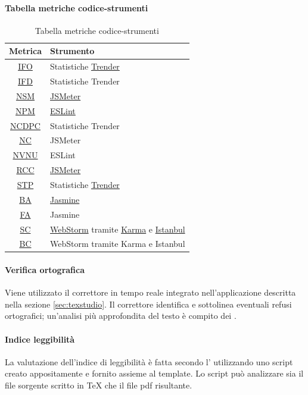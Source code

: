 		\paragraph{Tabella metriche codice-strumenti}
		\begin{table}[H]
			\centering
			\label{tab:metriceCodiceStrumenti}
			\begin{tabular}{cl}
				\toprule
				Metrica & Strumento \\
				\hline
				\hyperref[IFO]{IFO}		& Statistiche \hyperref[sec:trender]{Trender} \\
				\hyperref[IFD]{IFD}		& Statistiche Trender \\
				\hyperref[NSM]{NSM}		& \hyperref[sec:JSMeter]{JSMeter} \\
				\hyperref[NPM]{NPM}		& \hyperref[sec:ESLint]{ESLint} \\
				\hyperref[NCDPC]{NCDPC}	& Statistiche Trender \\
				\hyperref[NC]{NC}		& JSMeter \\
				\hyperref[NVNU]{NVNU} 	& ESLint \\
				\hyperref[RCC]{RCC}		& \hyperref[JSMeter]{JSMeter} \\
				\hyperref[STP]{STP}		& Statistiche \hyperref[par:trender]{Trender} \\
				\hyperref[BA]{BA}		& \hyperref[sec:Jasmine]{Jasmine} \\
				\hyperref[FA]{FA}		& Jasmine \\
				\hyperref[SC]{SC}		& \hyperref[sec:WebStorm]{WebStorm} tramite \hyperref[sec:Karma]{Karma} e \hyperref[sec:Istanbul]{Istanbul} \\
				\hyperref[BC]{BC}		& WebStorm tramite Karma e Istanbul \\
				\bottomrule    
			\end{tabular}
			\caption{Tabella metriche codice-strumenti}
		\end{table}
		\paragraph{Verifica ortografica}
		Viene utilizzato il correttore in tempo reale integrato nell'applicazione  descritta nella sezione \ref{sec:texstudio}. Il correttore identifica e sottolinea eventuali refusi ortografici; un'analisi più approfondita del testo è compito dei \verificatori.
		\paragraph{Indice leggibilità} \label{sec:gulpease}
		La valutazione dell'indice di leggibilità è fatta secondo l' utilizzando uno script creato appositamente e fornito assieme al template. Lo script può analizzare sia il file sorgente scritto in \TeX{} che il file pdf risultante.
